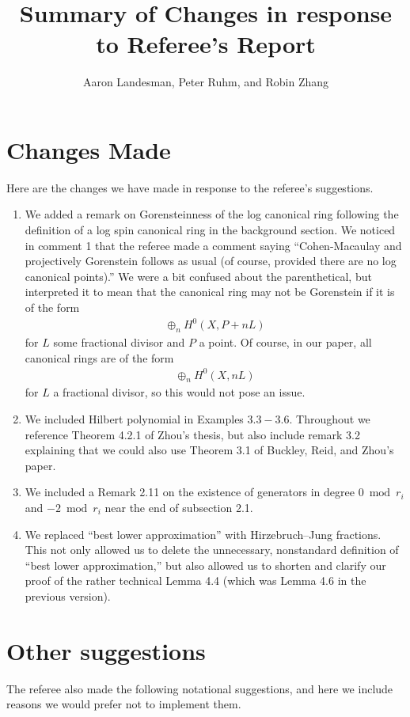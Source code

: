 \documentclass[10 pt]{amsart}
\title{Summary of Changes in response to Referee's Report}
\author{Aaron Landesman, Peter Ruhm, and Robin Zhang}
\theoremstyle{plain}
\theoremstyle{definition}
\theoremstyle{remark}
\numberwithin{equation}{section}
\begin{document}
\maketitle
\section{Changes Made}
Here are the changes we have made in response to the referee's suggestions.

\begin{enumerate}
	\item We added a remark on Gorensteinness of the log canonical ring following
	the definition of a log spin canonical ring in the background section.
	We noticed in comment 1 that the referee made a comment saying
	``Cohen-Macaulay and
projectively Gorenstein follows as usual (of course, provided there are
no log canonical points).'' We were a bit confused about the parenthetical, but interpreted
it to mean that the canonical ring may not be Gorenstein if it is of the form
\begin{align*}
	\oplus_n H^0(X, P + n L)
\end{align*}
for $L$ some fractional divisor and $P$ a point. Of course, in our paper, all canonical rings are of the form
\begin{align*}
	\oplus_n H^0(X, n L)
\end{align*}
for $L$ a fractional divisor, so this would not pose an issue.
	\item We included Hilbert polynomial in Examples $3.3- 3.6$.
		Throughout we reference Theorem 4.2.1 of Zhou's thesis,
		but also include remark 3.2 explaining that we could also use
		Theorem 3.1 of Buckley, Reid, and Zhou's paper.
	\item We included a Remark 2.11 on the existence of generators in degree $0 \bmod r_i$
		and $-2 \bmod r_i$ near the end of subsection 2.1.
	\item We replaced ``best lower approximation'' with Hirzebruch--Jung
		fractions. This not only allowed us to delete the unnecessary, nonstandard definition
		of ``best lower approximation,''
		but also allowed us to shorten and
		clarify our proof of the rather
		technical Lemma 4.4 (which was
		Lemma 4.6 in the previous version).
\end{enumerate}


\section{Other suggestions}
The referee also made the following notational suggestions,
and here we include reasons we would prefer not to implement them.
\end{document}
